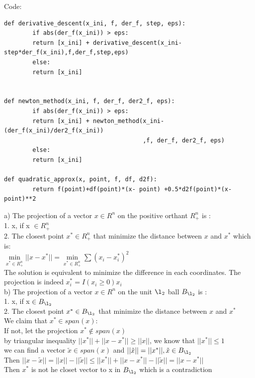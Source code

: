 \documentclass[11pt]{article}
\newenvironment{problem}[2][Problem]{\begin{trivlist}
\item[\hskip \labelsep {\bfseries #1}\hskip \labelsep {\bfseries #2.}]}{\end{trivlist}}
\begin{document}
\begin{problem}{2}
\end{problem}
Code:
\begin{verbatim}
def derivative_descent(x_ini, f, der_f, step, eps):
        if abs(der_f(x_ini)) > eps:
        return [x_ini] + derivative_descent(x_ini-step*der_f(x_ini),f,der_f,step,eps)
        else:
        return [x_ini]


def newton_method(x_ini, f, der_f, der2_f, eps):
        if abs(der_f(x_ini)) > eps:
        return [x_ini] + newton_method(x_ini- (der_f(x_ini)/der2_f(x_ini))
                                       ,f, der_f, der2_f, eps)
        else:
        return [x_ini]  
		
def quadratic_approx(x, point, f, df, d2f):
        return f(point)+df(point)*(x- point) +0.5*d2f(point)*(x-point)**2
\end{verbatim}


\begin{problem}{3}
\end{problem}
a) The projection of a vector $x \in R^n$ on the positive orthant $R_+^n$ is :\\
1. x, if x $\in R_+^n$\\
2. The closest point $x^* \in R_+^n$ that minimize the distance between $x $ and $ x^*$ which is: \\
$\min\limits_{x^* \in R_+^n} ||x - x^*|| =\min\limits_{x^* \in R_+^n} \sum (x_i - x_i^*)^2$\\
The solution is equivalent to minimize the difference in each coordinates. The projection is indeed $x^*_i = I(x_i \geq 0) x_i$ \\

b) The projection of a vector $x \in R^n$ on the unit $\l_2 $ ball $B_{\l_2}$ is :\\ 
1. x, if x $\in  B_{\l_2}$\\
2. The closest point $x^* \in B_{\l_2}$ that minimize the distance between $x $ and $ x^*$ \\
We claim that $x^* \in span(x)$:\\
If not, let the projection $x^* \notin span(x)$\\
by triangular inequality  $||x^*|| + ||x- x^*|| \geq ||x||$, we know that $||x^*|| \leq 1$\\
we can find a vector $\tilde{x} \in span(x)$ and $||\tilde{x}|| = ||x^*||, \tilde{x} \in B_{\l_2}$\\
Then $||x - \tilde{x}|| = ||x|| - ||\tilde{x}|| \leq ||x^*|| + ||x - x^*|| - ||\tilde{x}|| = ||x - x^*|| $\\
Then $x^* $ is not he closet vector to x in $B_{\l_2}$ which is a contradiction \\
\end{document}
